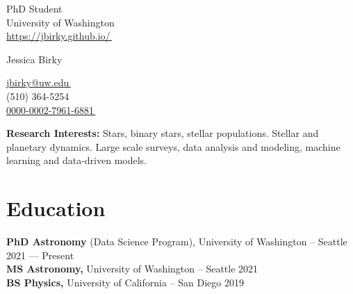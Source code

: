 \documentclass[a4,11pt]{article}
\let\orighref\href
\renewcommand{\href}[2]{\orighref{#1}{#2\,\scriptsize\faExternalLink}}
\begin{document}
\begin{center}
    \begin{minipage}[b]{0.24\textwidth}
            \flushleft  
            PhD Student \\
            University of Washington \\
            {\href{https://jbirky.github.io/}{https://jbirky.github.io/} } \\
    \end{minipage}   
    \begin{minipage}[b]{0.5\textwidth}
            \centering
            {\Huge Jessica Birky} \\ %
            \vspace{0.1cm}
    \end{minipage}%
    \begin{minipage}[b]{0.24\textwidth}
            \flushright
            \href{mailto:jbirky@uw.edu}{jbirky@uw.edu} \\
            (510) 364-5254 \\
            \href{https://orcid.org/0000-0002-7961-6881}{0000-0002-7961-6881}
    \end{minipage}%
    
\vspace{-0.15cm} 
{\color{UI_blue} \hrulefill}
\end{center}
\textbf{Research Interests:} Stars, binary stars, stellar populations. Stellar and planetary dynamics. Large scale surveys, data analysis and modeling, machine learning and data-driven models. 
\vspace{-0.2cm}


\section{Education }
\textbf{PhD Astronomy} (Data Science Program), University of Washington -- Seattle \hfill 2021 --- Present \\ 
\vspace{0.1cm}
\textbf{MS Astronomy,} University of Washington -- Seattle \hfill 2021 \\
\vspace{0.1cm}
\textbf{BS Physics,} University of California -- San Diego \hfill 2019
\end{document}
